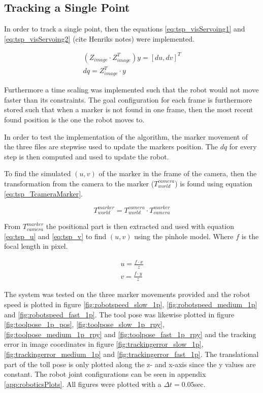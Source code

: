 \subsection{Tracking a Single Point}
In order to track a single point, then the equations \ref{eq:tsp_visServoing1} and \ref{eq:tsp_visServoing2} (cite Henriks notes) were implemented.

\begin{eqnarray}
(Z_{image} \cdot Z_{image}^T) y = [du, dv]^T \label{eq:tsp_visServoing1} \\
dq = Z_{image}^T \cdot y \label{eq:tsp_visServoing2}
\end{eqnarray}

Furthermore a time scaling was implemented such that the robot would not move faster than its constraints.
The goal configuration for each frame is furthermore stored such that when a marker is not found in one frame, then the most recent found position is the one the robot moves to.

In order to test the implementation of the algorithm, the marker movement of the three files are stepwise used to update the markers position.
The $dq$ for every step is then computed and used to update the robot.

To find the simulated $(u,v)$ of the marker in the frame of the camera, then the transformation from the camera to the marker ($T_{world}^{camera}$) is found using equation \ref{eq:tsp_TcameraMarker}.

\begin{equation}
T_{world}^{marker} = T_{world}^{camera} \cdot T_{camera}^{marker} \label{eq:tsp_TcameraMarker}
\end{equation}

From $T_{camera}^{marker}$ the positional part is then extracted and used with equation \ref{eq:tsp_u} and \ref{eq:tsp_v} to find $(u,v)$ using the pinhole model.
Where $f$ is the focal length in pixel.

\begin{eqnarray}
u = \frac{f \cdot x}{z} \label{eq:tsp_u} \\
v = \frac{f \cdot y}{z} \label{eq:tsp_v}
\end{eqnarray}


The system was tested on the three marker movements provided and the robot speed is plotted in figure \ref{fig:robotspeed_slow_1p}, \ref{fig:robotspeed_medium_1p} and \ref{fig:robotspeed_fast_1p}.
The tool pose was likewise plotted in figure \ref{fig:toolpose_1p_pos}, \ref{fig:toolpose_slow_1p_rpy}, \ref{fig:toolpose_medium_1p_rpy} and \ref{fig:toolpose_fast_1p_rpy} and the tracking error in image coordinates in figure \ref{fig:trackingerror_slow_1p}, \ref{fig:trackingerror_medium_1p} and \ref{fig:trackingerror_fast_1p}.
The translational part of the toll pose is only plotted along the z- and x-axis since the y values are constant.
The robot joint configurations can be seen in appendix \ref{app:roboticsPlots}.
All figures were plotted with a $\Delta t = 0.05$sec.

